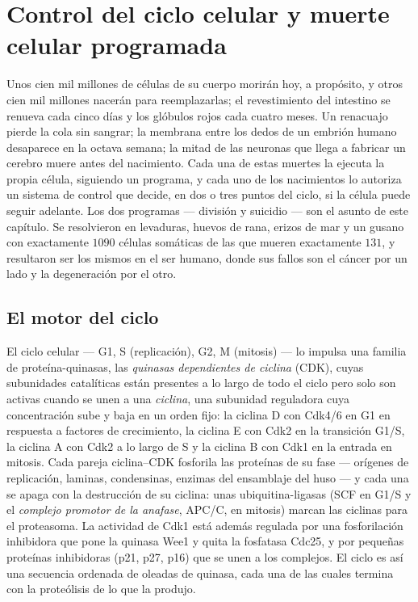 \chapter{Control del ciclo celular y muerte celular programada}\label{ch:b3:cell-cycle-apoptosis}

Unos cien mil millones de células de su cuerpo morirán hoy, a propósito,
y otros cien mil millones nacerán para reemplazarlas; el revestimiento
del intestino se renueva cada cinco días y los glóbulos rojos cada cuatro
meses. Un renacuajo pierde la cola sin sangrar; la membrana entre los
dedos de un embrión humano desaparece en la octava semana; la mitad de
las neuronas que llega a fabricar un cerebro muere antes del nacimiento.
Cada una de estas muertes la ejecuta la propia célula, siguiendo un
programa, y cada uno de los nacimientos lo autoriza un sistema de control
que decide, en dos o tres puntos del ciclo, si la célula puede seguir
adelante. Los dos programas --- división y suicidio --- son el asunto de
este capítulo. Se resolvieron en levaduras, huevos de rana, erizos de mar
y un gusano con exactamente $1090$ células somáticas de las que mueren
exactamente $131$, y resultaron ser los mismos en el ser humano, donde
sus fallos son el cáncer por un lado y la degeneración por el otro.

\section{El motor del ciclo}

\begin{definition}\label{def:b3:cell-cycle-apoptosis:cdk}
El ciclo celular --- G1, S (replicación), G2, M (mitosis) --- lo impulsa
una familia de proteína-quinasas, las \emph{quinasas dependientes de
ciclina} (CDK), cuyas subunidades catalíticas están presentes a lo largo
de todo el ciclo pero solo son activas cuando se unen a una
\emph{ciclina}, una subunidad reguladora cuya concentración sube y baja
en un orden fijo: la ciclina D con Cdk4/6 en G1 en respuesta a factores
de crecimiento, la ciclina E con Cdk2 en la transición G1/S, la ciclina A
con Cdk2 a lo largo de S y la ciclina B con Cdk1 en la entrada en
mitosis. Cada pareja ciclina--CDK fosforila las proteínas de su fase ---
orígenes de replicación, laminas, condensinas, enzimas del ensamblaje del
huso --- y cada una se apaga con la destrucción de su ciclina: unas
ubiquitina-ligasas (SCF en G1/S y el \emph{complejo promotor de la
anafase}, APC/C, en mitosis) marcan las ciclinas para el proteasoma. La
actividad de Cdk1 está además regulada por una fosforilación inhibidora
que pone la quinasa Wee1 y quita la fosfatasa Cdc25, y por pequeñas
proteínas inhibidoras (p21, p27, p16) que se unen a los complejos. El
ciclo es así una secuencia ordenada de oleadas de quinasa, cada una de
las cuales termina con la proteólisis de lo que la produjo.
\end{definition}

